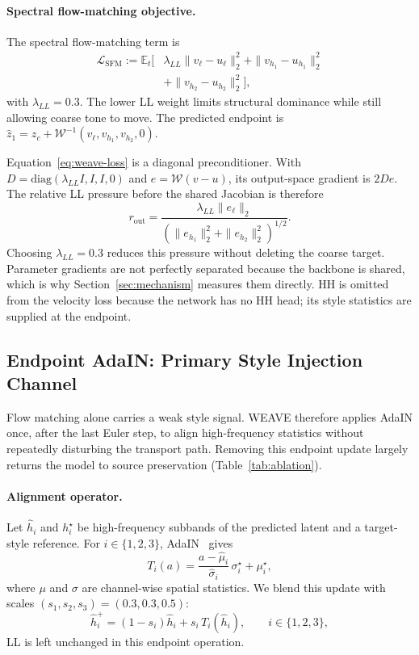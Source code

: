 \documentclass[letterpaper]{article}
\begin{document}
\paragraph{Spectral flow-matching objective.}
The spectral flow-matching term is
\begin{equation}
\begin{aligned}
\mathcal L_{\mathrm{SFM}}:=\mathbb E_t\big[&
\lambda_{LL}\|v_\ell-u_\ell\|_2^2
+\|v_{h_1}-u_{h_1}\|_2^2\\
&+\|v_{h_2}-u_{h_2}\|_2^2\big],
\end{aligned}
\label{eq:weave-loss}
\end{equation}
with $\lambda_{LL}=0.3$. The lower LL weight limits structural dominance while still allowing coarse tone to move. The predicted endpoint is $\hat z_1=z_c+\mathcal W^{-1}(v_\ell,v_{h_1},v_{h_2},0)$.

Equation~\ref{eq:weave-loss} is a diagonal preconditioner. With
$D=\mathrm{diag}(\lambda_{LL}I,I,I,0)$ and $e=\mathcal W(v-u)$, its output-space gradient is
$2De$. The relative LL pressure before the shared Jacobian is therefore
\begin{equation}
r_{\mathrm{out}}=
\frac{\lambda_{LL}\|e_\ell\|_2}
{(\|e_{h_1}\|_2^2+\|e_{h_2}\|_2^2)^{1/2}}.
\label{eq:gradient-pressure}
\end{equation}
Choosing $\lambda_{LL}=0.3$ reduces this pressure without deleting the coarse target.
Parameter gradients are not perfectly separated because the backbone is shared, which is
why Section~\ref{sec:mechanism} measures them directly. HH is omitted from the velocity
loss because the network has no HH head; its style statistics are supplied at the endpoint.

\subsection{Endpoint AdaIN: Primary Style Injection Channel}
\label{sec:eota}

Flow matching alone carries a weak style signal. WEAVE therefore applies AdaIN once, after the last Euler step, to align high-frequency statistics without repeatedly disturbing the transport path. Removing this endpoint update largely returns the model to source preservation (Table~\ref{tab:ablation}).

\paragraph{Alignment operator.}
Let $\hat h_i$ and $h_i^\star$ be high-frequency subbands of the predicted latent and a target-style reference. For $i\in\{1,2,3\}$, AdaIN~\cite{huang2017arbitrary} gives
\begin{equation}
T_i(a) = \frac{a-\hat\mu_i}{\hat\sigma_i}\,\sigma_i^\star+\mu_i^\star,
\end{equation}
where $\mu$ and $\sigma$ are channel-wise spatial statistics. We blend this update with scales $(s_1,s_2,s_3)=(0.3,0.3,0.5)$:
\begin{equation}
\hat h_i^+ = (1-s_i)\hat h_i + s_i\,T_i(\hat h_i),\qquad i\in\{1,2,3\},
\end{equation}
LL is left unchanged in this endpoint operation.
\end{document}
